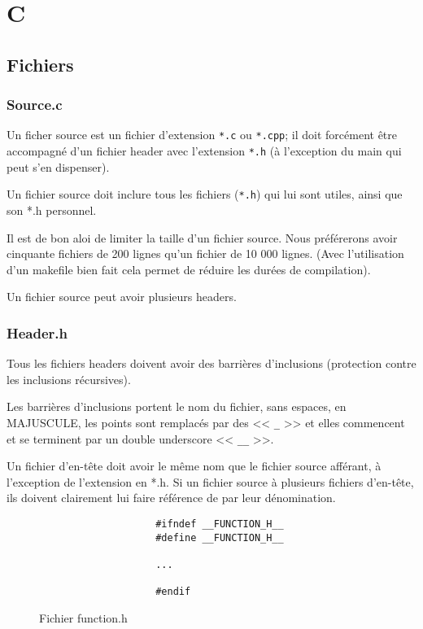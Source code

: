 \chapter{C}
	

	\section{Fichiers}
		\subsection{Source.c}
			Un ficher source est un fichier d'extension \verb+*.c+ ou \verb+*.cpp+; il doit forcément être accompagné d'un fichier header avec l'extension \verb+*.h+ (à l'exception du main qui peut s'en dispenser).

			Un fichier source doit inclure tous les fichiers (\verb+*.h+) qui lui sont utiles, ainsi que son *.h personnel.

			Il est de bon aloi de limiter la taille d'un fichier source. Nous préférerons avoir cinquante fichiers de 200 lignes qu'un fichier de 10 000 lignes. (Avec l'utilisation d'un makefile bien fait cela permet de réduire les durées de compilation).

			Un fichier source peut avoir plusieurs headers.

		\subsection{Header.h}
			Tous les fichiers headers doivent avoir des barrières d'inclusions (protection contre les inclusions récursives).
			
			Les barrières d'inclusions portent le nom du fichier, sans espaces, en MAJUSCULE, les points sont remplacés par des << \verb+_+ >> et elles commencent et se terminent par un double underscore << \verb+__+ >>.
		
			Un fichier d'en-tête doit avoir le même nom que le fichier source afférant, à l'exception de l'extension en *.h. Si un fichier source à plusieurs fichiers d'en-tête, ils doivent clairement lui faire référence de par leur dénomination.
			
			\begin{figure}[H]
				\begin{changemargin}{-2.5cm}{-2.5cm}
				\begin{tcolorbox}
				\begin{verbatim}
					#ifndef __FUNCTION_H__
					#define __FUNCTION_H__

					...

					#endif
				\end{verbatim}
				\end{tcolorbox}
				\end{changemargin}
				\caption{Fichier function.h}
			\end{figure}

